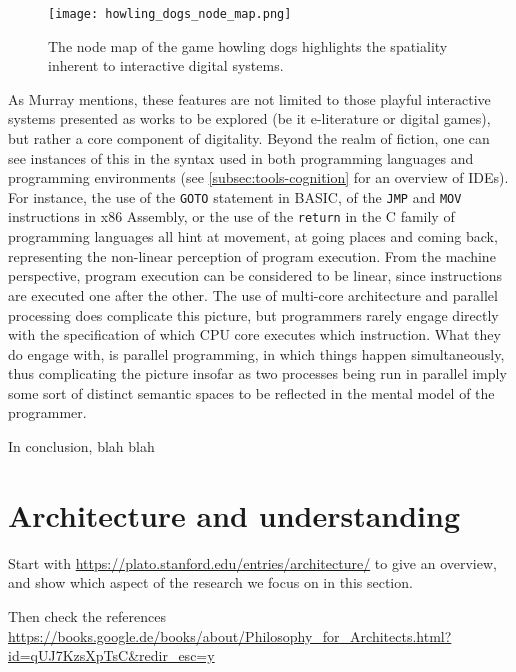 \begin{figure}
    \texttt{[image: howling\_dogs\_node\_map.png]}
    \caption{The node map of the game howling dogs highlights the spatiality inherent to interactive digital systems.}
    \label{graphic:howling-dogs}
\end{figure}

As Murray mentions, these features are not limited to those playful interactive systems presented as works to be explored (be it e-literature or digital games), but rather a core component of digitality. Beyond the realm of fiction, one can see instances of this in the syntax used in both programming languages and programming environments (see \ref{subsec:tools-cognition} for an overview of IDEs). For instance, the use of the \lstinline{GOTO} statement in BASIC, of the \lstinline{JMP} and \lstinline{MOV} instructions in x86 Assembly, or the use of the \lstinline{return} in the C family of programming languages all hint at movement, at going places and coming back, representing the non-linear perception of program execution. From the machine perspective, program execution can be considered to be linear, since instructions are executed one after the other. The use of multi-core architecture and parallel processing does complicate this picture, but programmers rarely engage directly with the specification of which CPU core executes which instruction. What they do engage with, is parallel programming, in which things happen simultaneously, thus complicating the picture insofar as two processes being run in parallel imply some sort of distinct semantic spaces to be reflected in the mental model of the programmer.

\spacer

In conclusion, blah blah


\section{Architecture and understanding}
\label{sec:arch-understanding}


Start with \url{https://plato.stanford.edu/entries/architecture/} to give an overview, and show which aspect of the research we focus on in this section.

Then check the references \url{https://books.google.de/books/about/Philosophy_for_Architects.html?id=qUJ7KzsXpTsC&redir_esc=y}

